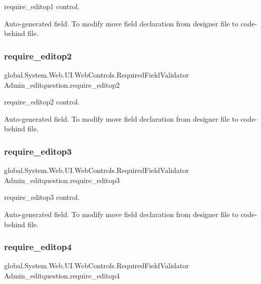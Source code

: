 require\+\_\+editop1 control. 

Auto-\/generated field. To modify move field declaration from designer file to code-\/behind file. \mbox{\label{class_admin__editquestion_a073a1b8e23006348cffd7c09da8261f4}} 
\subsubsection{\texorpdfstring{require\_editop2}{require\_editop2}}
{\footnotesize\ttfamily global.\+System.\+Web.\+U\+I.\+Web\+Controls.\+Required\+Field\+Validator Admin\+\_\+editquestion.\+require\+\_\+editop2\hspace{0.3cm}{\ttfamily [protected]}}



require\+\_\+editop2 control. 

Auto-\/generated field. To modify move field declaration from designer file to code-\/behind file. \mbox{\label{class_admin__editquestion_ac041ec1190c4f6a8200b74d022ddd112}} 
\subsubsection{\texorpdfstring{require\_editop3}{require\_editop3}}
{\footnotesize\ttfamily global.\+System.\+Web.\+U\+I.\+Web\+Controls.\+Required\+Field\+Validator Admin\+\_\+editquestion.\+require\+\_\+editop3\hspace{0.3cm}{\ttfamily [protected]}}



require\+\_\+editop3 control. 

Auto-\/generated field. To modify move field declaration from designer file to code-\/behind file. \mbox{\label{class_admin__editquestion_a6942a48cfc8c865d934f5cd6d1388c28}} 
\subsubsection{\texorpdfstring{require\_editop4}{require\_editop4}}
{\footnotesize\ttfamily global.\+System.\+Web.\+U\+I.\+Web\+Controls.\+Required\+Field\+Validator Admin\+\_\+editquestion.\+require\+\_\+editop4\hspace{0.3cm}{\ttfamily [protected]}}




